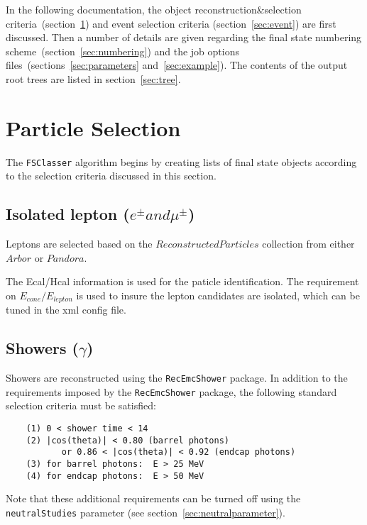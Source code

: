 \documentclass[11pt,a4paper]{define/cepcnote}
\begin{document}
In the following documentation, the object reconstruction\&selection criteria~(section~\ref{sec:particles}) 
and event selection criteria (section~\ref{sec:event}) are first discussed.  
Then a number of details are given regarding the final state numbering scheme~(section~\ref{sec:numbering}) 
and the job options files~(sections~\ref{sec:parameters} and~\ref{sec:example}).  
The contents of the output root trees are listed in section~\ref{sec:tree}.  

\section{Particle Selection}
\label{sec:particles}

The {\tt FSClasser} algorithm begins by creating lists of final state objects according to the selection criteria 
discussed in this section.

\subsection[Isolated lepton ($e^{\pm} and \mu^{\pm}$)]{\boldmath Isolated lepton ($e^{\pm} and \mu^{\pm}$)}
\label{sec:tracks}

Leptons are selected based on the $ReconstructedParticles$ collection from either $Arbor$ or $Pandora$. 


The Ecal/Hcal information is used for the paticle identification. 
The requirement on $E_{cone}/E_{lepton}$ is used to insure the lepton candidates are isolated, which can be tuned in the xml config file. 


\subsection[Showers ($\gamma$)]{\boldmath Showers ($\gamma$)}
\label{sec:showers}

Showers are reconstructed using the {\tt RecEmcShower} package.  
In addition to the requirements imposed by the {\tt RecEmcShower} package, 
the following standard selection criteria must be satisfied:

\begin{verbatim}
    (1) 0 < shower time < 14
    (2) |cos(theta)| < 0.80 (barrel photons) 
           or 0.86 < |cos(theta)| < 0.92 (endcap photons)
    (3) for barrel photons:  E > 25 MeV
    (4) for endcap photons:  E > 50 MeV
\end{verbatim}

Note that these additional requirements can be turned off using the {\tt neutralStudies} parameter (see section~\ref{sec:neutralparameter}).
\end{document}
